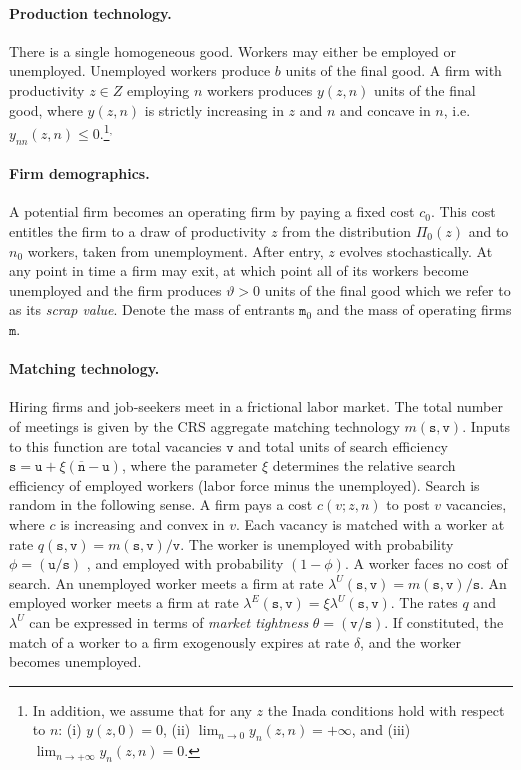 \vspace*{-.3cm}
\paragraph{Production technology.}
There is a single homogeneous good.
Workers may either be employed or unemployed.
Unemployed workers produce $b$ units of the final good.
A firm with productivity $z\in Z$ employing $n$ workers produces $y(z,n)$ units of the final good, where $y(z,n)$ is strictly increasing in $z$ and $n$ and concave in $n$, i.e. $y_{nn}(z,n)\leq0$.\footnote{
    In addition, we assume that for any $z$ the Inada conditions hold with respect to $n$: (i) $y(z,0)=0$, (ii) $\lim_{n\rightarrow 0}y_n(z,n) =+\infty$, and (iii) $\lim_{n\rightarrow +\infty}y_n(z,n) = 0$.}$^,$


\paragraph{Firm demographics.}
A potential firm becomes an operating firm by paying a fixed cost $c_0$.
This cost entitles the firm to a draw of productivity $z$ from the distribution $\Pi_{0}\left( z\right)$ and to $n_0$ workers, taken from unemployment.
After entry, $z$ evolves stochastically.
At any point in time a firm may exit, at which point all of its workers become unemployed and the firm produces $\vartheta>0$ units of the final good which we refer to as its \emph{scrap value}.
Denote the mass of entrants $\mathtt{m}_0$ and the mass of operating firms $\mathtt{m}$.

\vspace*{-.3cm}
\paragraph{Matching technology.}
Hiring firms and job-seekers meet in a frictional labor market.
The total number of meetings is given by the CRS aggregate matching technology $m(\mathtt{s},\mathtt{v})$.
Inputs to this function are total vacancies $\mathtt{v}$ and total units of search efficiency $\mathtt{s} = \mathtt{u} + \xi(\overline{\mathtt{n}}-\mathtt{u})$,
where the parameter $\xi$ determines the relative search efficiency of employed workers (labor force minus the unemployed).
Search is random in the following sense.
A firm pays a cost $c(v;z,n)$ to post $v$ vacancies, where $c$ is increasing and convex in $v$.
Each vacancy is matched with a worker at rate $q(\mathtt{s},\mathtt{v}) = m(\mathtt{s},\mathtt{v})/\mathtt{v}$.
The worker is unemployed with probability $\phi = (\mathtt{u}/\mathtt{s})$ , and employed with probability $(1-\phi)$.
A worker faces no cost of search.
An unemployed worker meets a firm at rate $\lambda^U(\mathtt{s},\mathtt{v}) = m(\mathtt{s},\mathtt{v})/\mathtt{s}$.
An employed worker meets a firm at rate $\lambda^E(\mathtt{s},\mathtt{v}) = \xi \lambda^U(\mathtt{s},\mathtt{v})$.
The rates $q$ and $\lambda^U$ can be expressed in terms of \emph{market tightness} $\theta=(\mathtt{v}/\mathtt{s})$.
If constituted, the match of a worker to a firm exogenously expires at rate $\delta$, and the worker becomes unemployed.

